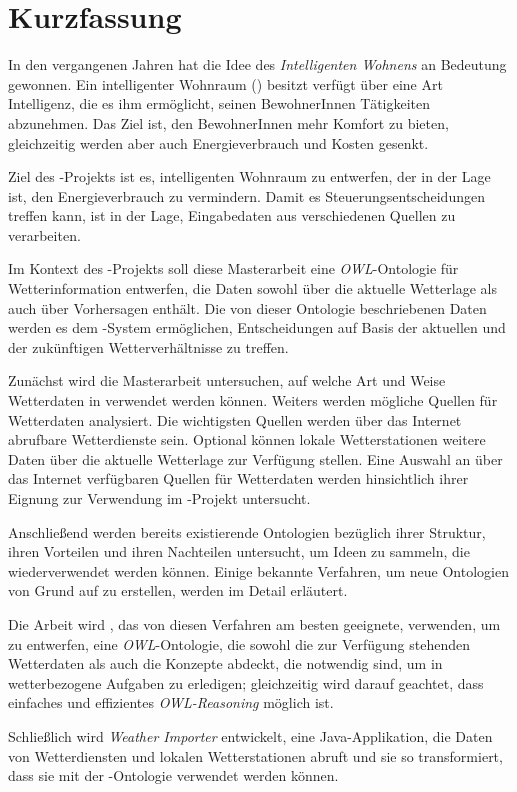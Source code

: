 \chapter*{Kurzfassung}

In den vergangenen Jahren hat die Idee des \emph{Intelligenten Wohnens} an Bedeutung gewonnen. Ein intelligenter Wohnraum (\smarthome) besitzt verfügt über eine Art Intelligenz, die es ihm ermöglicht, seinen BewohnerInnen Tätigkeiten abzunehmen. Das Ziel ist, den BewohnerInnen mehr Komfort zu bieten, gleichzeitig werden aber auch Energieverbrauch und Kosten gesenkt.

Ziel des \thinkhome-Projekts ist es, intelligenten Wohnraum zu entwerfen, der in der Lage ist, den Energieverbrauch zu vermindern. Damit es Steuerungsentscheidungen treffen kann, ist \thinkhome in der Lage, Eingabedaten aus verschiedenen Quellen zu verarbeiten.

Im Kontext des \thinkhome-Projekts soll diese Masterarbeit eine \emph{OWL}-Ontologie für Wetterinformation entwerfen, die Daten sowohl über die aktuelle Wetterlage als auch über Vorhersagen enthält. Die von dieser Ontologie beschriebenen Daten werden es dem \thinkhome-System ermöglichen, Entscheidungen auf Basis der aktuellen und der zukünftigen Wetterverhältnisse zu treffen.

Zunächst wird die Masterarbeit untersuchen, auf welche Art und Weise Wetterdaten in \thinkhome verwendet werden können. Weiters werden mögliche Quellen für Wetterdaten analysiert. Die wichtigsten Quellen werden über das Internet abrufbare Wetterdienste sein. Optional können lokale Wetterstationen weitere Daten über die aktuelle Wetterlage zur Verfügung stellen. Eine Auswahl an über das Internet verfügbaren Quellen für Wetterdaten werden hinsichtlich ihrer Eignung zur Verwendung im \thinkhome-Projekt untersucht.

Anschließend werden bereits existierende Ontologien bezüglich ihrer Struktur, ihren Vorteilen und ihren Nachteilen untersucht, um Ideen zu sammeln, die wiederverwendet werden können. Einige bekannte Verfahren, um neue Ontologien von Grund auf zu erstellen, werden im Detail erläutert.

Die Arbeit wird \methontology, das von diesen Verfahren am besten geeignete, verwenden, um \smarthomeweather zu entwerfen, eine \textit{OWL}-Ontologie, die sowohl die zur Verfügung stehenden Wetterdaten als auch die Konzepte abdeckt, die notwendig sind, um in \thinkhome wetterbezogene Aufgaben zu erledigen; gleichzeitig wird darauf geachtet, dass einfaches und effizientes \emph{OWL-Reasoning} möglich ist.

Schließlich wird \emph{Weather Importer} entwickelt, eine Java-Applikation, die Daten von Wetterdiensten und lokalen Wetterstationen abruft und sie so transformiert, dass sie mit der \smarthomeweather-Ontologie verwendet werden können.
